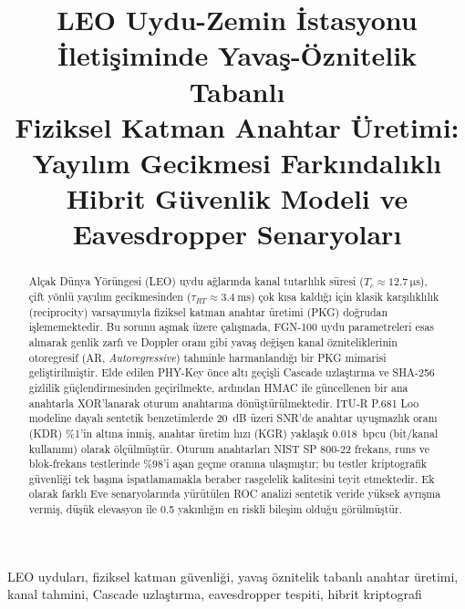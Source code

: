 \documentclass[conference,a4paper]{IEEEtran}
\begin{document}
\title{LEO Uydu-Zemin İstasyonu İletişiminde Yavaş-Öznitelik Tabanlı\\
Fiziksel Katman Anahtar Üretimi: Yayılım Gecikmesi Farkındalıklı\\
Hibrit Güvenlik Modeli ve Eavesdropper Senaryoları}
\author{
}

\maketitle

\begin{abstract}
Alçak Dünya Yörüngesi (LEO) uydu ağlarında kanal tutarlılık süresi ($T_c \approx \SI{12.7}{\micro\second}$), çift yönlü yayılım gecikmesinden ($\tau_{RT} \approx \SI{3.4}{\milli\second}$) çok kısa kaldığı için klasik karşılıklılık (reciprocity) varsayımıyla fiziksel katman anahtar üretimi (PKG) doğrudan işlememektedir. Bu sorunu aşmak üzere çalışmada, FGN-100 uydu parametreleri esas alınarak genlik zarfı ve Doppler oranı gibi yavaş değişen kanal özniteliklerinin otoregresif (AR, \emph{Autoregressive}) tahminle harmanlandığı bir PKG mimarisi geliştirilmiştir. Elde edilen PHY-Key önce altı geçişli Cascade uzlaştırma ve SHA-256 gizlilik güçlendirmesinden geçirilmekte, ardından HMAC ile güncellenen bir ana anahtarla XOR'lanarak oturum anahtarına dönüştürülmektedir. ITU-R P.681 Loo modeline dayalı sentetik benzetimlerde \SI{20}{dB} üzeri SNR'de anahtar uyuşmazlık oranı (KDR) \%1'in altına inmiş, anahtar üretim hızı (KGR) yaklaşık \SI{0.018}{bpcu} (bit/kanal kullanımı) olarak ölçülmüştür. Oturum anahtarları NIST SP 800-22 frekans, runs ve blok-frekans testlerinde \%98'i aşan geçme oranına ulaşmıştır; bu testler kriptografik güvenliği tek başına ispatlamamakla beraber rasgelelik kalitesini teyit etmektedir. Ek olarak farklı Eve senaryolarında yürütülen ROC analizi sentetik veride yüksek ayrışma vermiş, düşük elevasyon ile \SI{0.5}{\lambda} yakınlığın en riskli bileşim olduğu görülmüştür.
\end{abstract}

\begin{IEEEkeywords}
LEO uyduları, fiziksel katman güvenliği, yavaş öznitelik tabanlı anahtar üretimi, kanal tahmini, Cascade uzlaştırma, eavesdropper tespiti, hibrit kriptografi
\end{IEEEkeywords}
\end{document}
